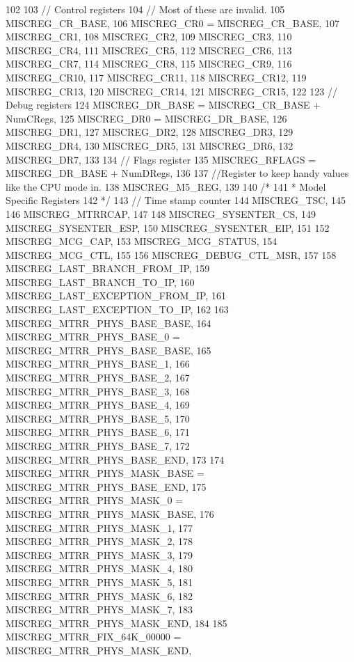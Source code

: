 \begin{DoxyCode}
102     {
103         // Control registers
104         // Most of these are invalid.
105         MISCREG_CR_BASE,
106         MISCREG_CR0 = MISCREG_CR_BASE,
107         MISCREG_CR1,
108         MISCREG_CR2,
109         MISCREG_CR3,
110         MISCREG_CR4,
111         MISCREG_CR5,
112         MISCREG_CR6,
113         MISCREG_CR7,
114         MISCREG_CR8,
115         MISCREG_CR9,
116         MISCREG_CR10,
117         MISCREG_CR11,
118         MISCREG_CR12,
119         MISCREG_CR13,
120         MISCREG_CR14,
121         MISCREG_CR15,
122 
123         // Debug registers
124         MISCREG_DR_BASE = MISCREG_CR_BASE + NumCRegs,
125         MISCREG_DR0 = MISCREG_DR_BASE,
126         MISCREG_DR1,
127         MISCREG_DR2,
128         MISCREG_DR3,
129         MISCREG_DR4,
130         MISCREG_DR5,
131         MISCREG_DR6,
132         MISCREG_DR7,
133 
134         // Flags register
135         MISCREG_RFLAGS = MISCREG_DR_BASE + NumDRegs,
136 
137         //Register to keep handy values like the CPU mode in.
138         MISCREG_M5_REG,
139 
140         /*
141          * Model Specific Registers
142          */
143         // Time stamp counter
144         MISCREG_TSC,
145 
146         MISCREG_MTRRCAP,
147 
148         MISCREG_SYSENTER_CS,
149         MISCREG_SYSENTER_ESP,
150         MISCREG_SYSENTER_EIP,
151 
152         MISCREG_MCG_CAP,
153         MISCREG_MCG_STATUS,
154         MISCREG_MCG_CTL,
155 
156         MISCREG_DEBUG_CTL_MSR,
157 
158         MISCREG_LAST_BRANCH_FROM_IP,
159         MISCREG_LAST_BRANCH_TO_IP,
160         MISCREG_LAST_EXCEPTION_FROM_IP,
161         MISCREG_LAST_EXCEPTION_TO_IP,
162 
163         MISCREG_MTRR_PHYS_BASE_BASE,
164         MISCREG_MTRR_PHYS_BASE_0 = MISCREG_MTRR_PHYS_BASE_BASE,
165         MISCREG_MTRR_PHYS_BASE_1,
166         MISCREG_MTRR_PHYS_BASE_2,
167         MISCREG_MTRR_PHYS_BASE_3,
168         MISCREG_MTRR_PHYS_BASE_4,
169         MISCREG_MTRR_PHYS_BASE_5,
170         MISCREG_MTRR_PHYS_BASE_6,
171         MISCREG_MTRR_PHYS_BASE_7,
172         MISCREG_MTRR_PHYS_BASE_END,
173 
174         MISCREG_MTRR_PHYS_MASK_BASE = MISCREG_MTRR_PHYS_BASE_END,
175         MISCREG_MTRR_PHYS_MASK_0 = MISCREG_MTRR_PHYS_MASK_BASE,
176         MISCREG_MTRR_PHYS_MASK_1,
177         MISCREG_MTRR_PHYS_MASK_2,
178         MISCREG_MTRR_PHYS_MASK_3,
179         MISCREG_MTRR_PHYS_MASK_4,
180         MISCREG_MTRR_PHYS_MASK_5,
181         MISCREG_MTRR_PHYS_MASK_6,
182         MISCREG_MTRR_PHYS_MASK_7,
183         MISCREG_MTRR_PHYS_MASK_END,
184 
185         MISCREG_MTRR_FIX_64K_00000 = MISCREG_MTRR_PHYS_MASK_END,
}
\end{DoxyCode}
